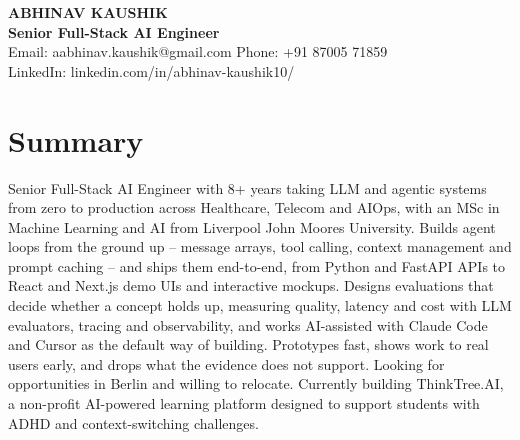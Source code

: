 \documentclass[10pt,a4paper]{article}
\begin{document}
\begin{center}
  {\Large\bfseries ABHINAV KAUSHIK}\\[1pt]
  \textbf{Senior Full-Stack AI Engineer}\\[1pt]
  Email: aabhinav.kaushik@gmail.com \quad Phone: +91 87005 71859\\
  LinkedIn: linkedin.com/in/abhinav-kaushik10/
\end{center}

\section{Summary}
Senior Full-Stack AI Engineer with 8+ years taking LLM and agentic systems from zero to production across Healthcare,
Telecom and AIOps, with an MSc in Machine Learning and AI from Liverpool John Moores University. Builds agent loops
from the ground up -- message arrays, tool calling, context management and prompt caching -- and ships them end-to-end,
from Python and FastAPI APIs to React and Next.js demo UIs and interactive mockups. Designs evaluations that decide
whether a concept holds up, measuring quality, latency and cost with LLM evaluators, tracing and observability, and
works AI-assisted with Claude Code and Cursor as the default way of building. Prototypes fast, shows work to real
users early, and drops what the evidence does not support. Looking for opportunities in Berlin and willing to
relocate. Currently building ThinkTree.AI, a non-profit AI-powered learning platform designed to support students
with ADHD and context-switching challenges.
\end{document}

